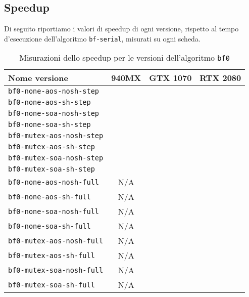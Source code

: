 \documentclass{article}
\begin{document}
	\subsection{Speedup}
	Di seguito riportiamo i valori di speedup di ogni versione, rispetto al tempo d'esecuzione dell'algoritmo \texttt{bf-serial}, misurati su ogni scheda.
	\begin{table}[!ht]
		\centering
		\begin{tabular}{|l|c|c|c|}
			\hline
			\textbf{Nome versione} & \textbf{940MX} & \textbf{GTX 1070} & \textbf{RTX 2080} \\ \hline
			\texttt{bf0-none-aos-nosh-step}  &  &  &  \\ \hline
			\texttt{bf0-none-aos-sh-step}    &  &  &  \\ \hline
			\texttt{bf0-none-soa-nosh-step}  &  &  &  \\ \hline
			\texttt{bf0-none-soa-sh-step}    &  &  &  \\ \hline
			\texttt{bf0-mutex-aos-nosh-step} &  &  &  \\ \hline
			\texttt{bf0-mutex-aos-sh-step}   &  &  &  \\ \hline
			\texttt{bf0-mutex-soa-nosh-step} &  &  &  \\ \hline
			\texttt{bf0-mutex-soa-sh-step}   &  &  &  \\ \hline
			\texttt{bf0-none-aos-nosh-full}  & N/A &  &  \\ \hline
			\texttt{bf0-none-aos-sh-full}    & N/A &  &  \\ \hline
			\texttt{bf0-none-soa-nosh-full}  & N/A &  &  \\ \hline
			\texttt{bf0-none-soa-sh-full}    & N/A &  &  \\ \hline
			\texttt{bf0-mutex-aos-nosh-full} & N/A &  &  \\ \hline
			\texttt{bf0-mutex-aos-sh-full}   & N/A &  &  \\ \hline
			\texttt{bf0-mutex-soa-nosh-full} & N/A &  &  \\ \hline
			\texttt{bf0-mutex-soa-sh-full}   & N/A &  &  \\ \hline
		\end{tabular}
		\label{tab:speedup_bf0}
		\caption{Misurazioni dello speedup per le versioni dell'algoritmo \texttt{bf0}}
	\end{table}
	
\end{document}
